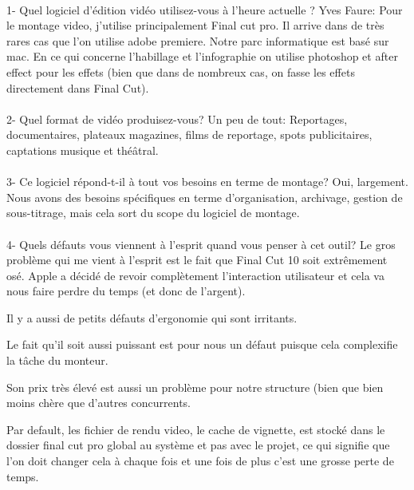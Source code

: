 \paragraph{}
1-  Quel logiciel d'édition vidéo utilisez-vous à l'heure actuelle ?
Yves Faure: Pour le montage video, j'utilise principalement Final cut pro. Il
arrive dans de très rares cas que l'on utilise adobe premiere. Notre
parc informatique est basé sur mac. En ce qui concerne l'habillage et
l'infographie on utilise photoshop et  after effect pour les effets (bien
que dans de nombreux cas, on fasse les effets directement dans Final Cut).

\paragraph{}
2- Quel format de vidéo produisez-vous?
Un peu de tout: Reportages, documentaires, plateaux magazines, films de reportage, spots
publicitaires, captations musique et théâtral.

\paragraph{}
3- Ce logiciel répond-t-il à tout vos besoins en terme de montage?
Oui, largement. Nous avons des besoins spécifiques en terme d'organisation,
archivage, gestion de sous-titrage, mais cela sort du scope du logiciel de
montage.

\paragraph{}
4- Quels défauts vous viennent à l'esprit quand vous penser à cet outil?
Le gros problème qui me vient à l'esprit est le fait que Final Cut 10 soit
extrêmement osé. Apple a décidé de revoir complètement l'interaction
utilisateur et cela va nous faire perdre du temps (et donc de l'argent). 

Il y a aussi de petits défauts d'ergonomie qui sont irritants.

Le fait qu'il soit aussi puissant est pour nous un défaut puisque cela
complexifie la tâche du monteur.

Son prix très élevé est aussi un problème pour notre structure (bien que bien
moins chère que d'autres concurrents.

Par default, les fichier de rendu video, le cache de vignette, est stocké dans
le dossier final cut pro global au  système et pas avec le projet, ce qui
signifie que l'on doit changer cela à chaque fois et une fois de plus c'est une
grosse perte de temps.

